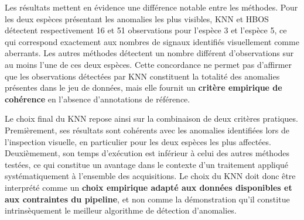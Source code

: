 \documentclass[12pt,a4paper,twoside]{article}
\begin{document}
\begin{table}[H]
    \centering
    \caption{Outliers détectés par espèce selon les méthodes de détection}
    \label{tab:outliers_detection}
\end{table}

Les résultats mettent en évidence une différence notable entre les méthodes. Pour les deux espèces présentant les anomalies les plus visibles, KNN et HBOS détectent respectivement \num{16} et \num{51} observations pour l'espèce 3 et l'espèce 5, ce qui correspond exactement aux nombres de signaux identifiés visuellement comme aberrants. Les autres méthodes détectent un nombre différent d'observations sur au moins l'une de ces deux espèces. Cette concordance ne permet pas d'affirmer que les observations détectées par KNN constituent la totalité des anomalies présentes dans le jeu de données, mais elle fournit un \textbf{critère empirique de cohérence} en l'absence d'annotations de référence.

Le choix final du KNN repose ainsi sur la combinaison de deux critères pratiques. Premièrement, ses résultats sont cohérents avec les anomalies identifiées lors de l'inspection visuelle, en particulier pour les deux espèces les plus affectées. Deuxièmement, son temps d'exécution est inférieur à celui des autres méthodes testées, ce qui constitue un avantage dans le contexte d'un traitement appliqué systématiquement à l'ensemble des acquisitions. Le choix du KNN doit donc être interprété comme un \textbf{choix empirique adapté aux données disponibles et aux contraintes du pipeline}, et non comme la démonstration qu'il constitue intrinsèquement le meilleur algorithme de détection d'anomalies.
\end{document}

